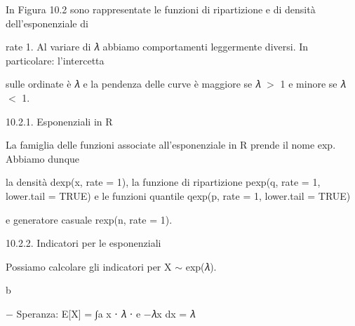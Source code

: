 \documentclass[a4paper,portrait,12pt]{article}
\begin{document}
\begin{flushleft}
In Figura 10.2 sono rappresentate le funzioni di ripartizione e di densit\`{a} dell'esponenziale di
\end{flushleft}


\begin{flushleft}
rate 1. Al variare di 𝜆 abbiamo comportamenti leggermente diversi. In particolare: l'intercetta
\end{flushleft}


\begin{flushleft}
sulle ordinate \`{e} 𝜆 e la pendenza delle curve \`{e} maggiore se 𝜆 $>$ 1 e minore se 𝜆 $<$ 1.
\end{flushleft}





\begin{flushleft}
10.2.1. Esponenziali in R
\end{flushleft}


\begin{flushleft}
La famiglia delle funzioni associate all'esponenziale in R prende il nome exp. Abbiamo dunque
\end{flushleft}


\begin{flushleft}
la densit\`{a} dexp(x, rate = 1), la funzione di ripartizione pexp(q, rate = 1, lower.tail = TRUE) e le funzioni quantile qexp(p, rate = 1, lower.tail = TRUE)
\end{flushleft}


\begin{flushleft}
e generatore casuale rexp(n, rate = 1).
\end{flushleft}





\begin{flushleft}
10.2.2. Indicatori per le esponenziali
\end{flushleft}


\begin{flushleft}
Possiamo calcolare gli indicatori per X $\sim$ exp(𝜆).
\end{flushleft}


\begin{flushleft}
b
\end{flushleft}





\begin{flushleft}
$-$ Speranza: E[X] = ∫a x ⋅ 𝜆 ⋅ e $-$𝜆x dx = 𝜆
\end{flushleft}
\end{document}
